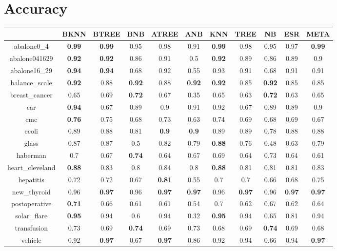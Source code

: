 \documentclass{article}%
\begin{document}
%
\normalsize%
\section*{Accuracy}%
\begin{tabular}{c|cccccccccc}%
\hline%
&BKNN&BTREE&BNB&ATREE&ANB&KNN&TREE&NB&ESR&META\\%
\hline%
abalone0\_4&\textbf{0.99}&\textbf{0.99}&0.95&0.98&0.91&\textbf{0.99}&0.98&0.95&0.97&\textbf{0.99}\\%
\hline%
abalone041629&\textbf{0.92}&\textbf{0.92}&0.86&0.91&0.5&\textbf{0.92}&0.89&0.86&0.89&0.9\\%
\hline%
abalone16\_29&\textbf{0.94}&\textbf{0.94}&0.68&0.92&0.55&0.93&0.91&0.68&0.91&0.91\\%
\hline%
balance\_scale&\textbf{0.92}&0.88&\textbf{0.92}&0.88&\textbf{0.92}&\textbf{0.92}&0.85&\textbf{0.92}&0.85&0.85\\%
\hline%
breast\_cancer&0.65&0.69&\textbf{0.72}&0.67&0.35&0.65&0.63&\textbf{0.72}&0.63&0.65\\%
\hline%
car&\textbf{0.94}&0.67&0.89&0.9&0.91&0.92&0.67&0.89&0.89&0.9\\%
\hline%
cmc&\textbf{0.76}&0.75&0.68&0.73&0.63&0.74&0.69&0.68&0.69&0.67\\%
\hline%
ecoli&0.89&0.88&0.81&\textbf{0.9}&\textbf{0.9}&0.89&0.89&0.78&0.88&0.88\\%
\hline%
glass&0.87&0.87&0.5&0.82&0.79&\textbf{0.88}&0.76&0.48&0.63&0.79\\%
\hline%
haberman&0.7&0.67&\textbf{0.74}&0.64&0.67&0.69&0.64&0.73&0.64&0.61\\%
\hline%
heart\_cleveland&\textbf{0.88}&0.83&0.8&0.84&0.8&\textbf{0.88}&0.81&0.81&0.81&0.83\\%
\hline%
hepatitis&0.72&0.72&0.67&\textbf{0.81}&0.55&0.7&0.7&0.66&0.68&0.75\\%
\hline%
new\_thyroid&0.96&\textbf{0.97}&0.96&\textbf{0.97}&\textbf{0.97}&0.96&\textbf{0.97}&0.96&\textbf{0.97}&\textbf{0.97}\\%
\hline%
postoperative&\textbf{0.71}&0.66&0.61&0.61&0.54&0.7&0.62&0.67&0.62&0.64\\%
\hline%
solar\_flare&\textbf{0.95}&0.94&0.6&0.94&0.32&\textbf{0.95}&0.94&0.65&0.81&0.94\\%
\hline%
transfusion&0.73&0.69&\textbf{0.74}&0.69&0.73&0.68&0.69&\textbf{0.74}&0.69&0.68\\%
\hline%
vehicle&0.92&\textbf{0.97}&0.67&\textbf{0.97}&0.86&0.92&0.94&0.66&0.94&\textbf{0.97}\\%

\end{tabular}
\end{document}
